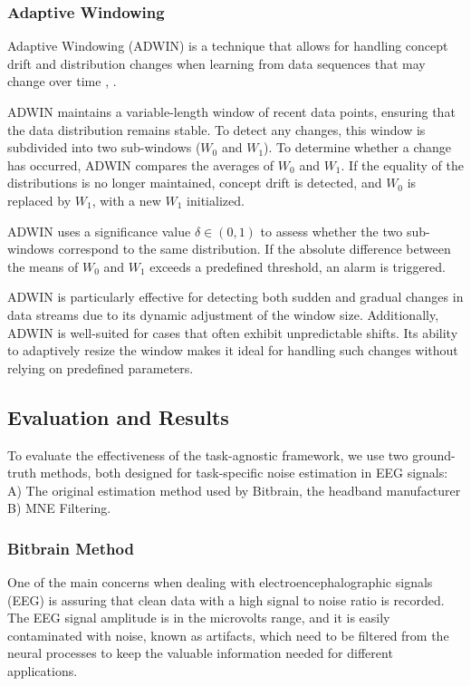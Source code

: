 \subsubsection{Adaptive Windowing}

Adaptive Windowing (ADWIN) is a technique that allows for handling concept drift and distribution changes when learning from data sequences that may change over time \cite{bifet2007learning}, \cite{sun2016online}.

ADWIN maintains a variable-length window of recent data points, ensuring that the data distribution remains stable. To detect any changes, this window is subdivided into two sub-windows ($W_0$ and $W_1$). To determine whether a change has occurred, ADWIN compares the averages of $W_0$ and $W_1$. If the equality of the distributions is no longer maintained, concept drift is detected, and $W_0$ is replaced by $W_1$, with a new $W_1$ initialized.

ADWIN uses a significance value \(\delta \in (0,1)\) to assess whether the two sub-windows correspond to the same distribution. If the absolute difference between the means of $W_0$ and $W_1$ exceeds a predefined threshold, an alarm is triggered. 

ADWIN is particularly effective for detecting both sudden and gradual changes in data streams due to its dynamic adjustment of the window size. Additionally, ADWIN is well-suited for cases that often exhibit unpredictable shifts. Its ability to adaptively resize the window makes it ideal for handling such changes without relying on predefined parameters.

\subsection{Evaluation and Results}

To evaluate the effectiveness of the task-agnostic framework, we use two ground-truth methods, both designed for task-specific noise estimation in EEG signals: A) The original estimation method used by Bitbrain, the headband manufacturer B) MNE Filtering.

\subsubsection{Bitbrain Method}
One of the main concerns when dealing with electroencephalographic signals (EEG) is assuring that clean data with a high signal to noise ratio is recorded. The EEG signal amplitude is in the microvolts range, and it is easily contaminated with noise, known as artifacts, which need to be filtered from the neural processes to keep the valuable information needed for different applications. 

